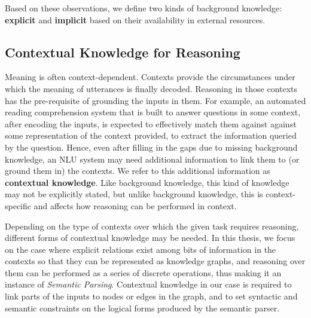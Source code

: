 Based on these observations, we define two kinds of background knowledge: \textbf{explicit} and
\textbf{implicit} based on their availability in external resources.


\subsection{Contextual Knowledge for Reasoning}
Meaning is often context-dependent. Contexts provide the circumstances under which the meaning of
utterances is finally decoded. Reasoning in those contexts has the pre-requisite of grounding the
inputs in them.  For example, an automated reading comprehension system that is built to answer
questions in some context, after encoding the inputs, is expected to effectively match them against
against some representation of the context provided, to extract the information queried by the
question.  Hence, even after filling in the gaps due to missing background knowledge, an NLU system
may need additional information to link them to (or ground them in) the contexts.  We refer to this
additional information as \textbf{contextual knowledge}.  Like background knowledge, this kind of
knowledge may not be explicitly stated, but unlike background knowledge, this is context-specific and
affects how reasoning can be performed in context.

Depending on the type of contexts over which the given task requires reasoning, different forms of
contextual knowledge may be needed.  In this thesis, we focus on the case where explicit relations
exist among bits of information in the contexts so that they can be represented as knowledge graphs,
and reasoning over them can be performed as a series of discrete operations, thus making it an instance of
\emph{Semantic Parsing}. Contextual knowledge in our case is required to link parts of the inputs to nodes or
edges in the graph, and to set syntactic and semantic constraints on the logical forms produced by
the semantic parser.

